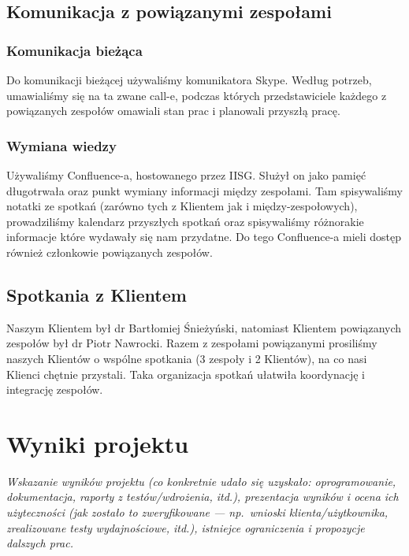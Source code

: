 \documentclass[polish,12pt]{aghthesis}
\begin{document}
\subsection{Komunikacja z powiązanymi zespołami}
\subsubsection{Komunikacja bieżąca}
Do komunikacji bieżącej używaliśmy komunikatora Skype. Według potrzeb, umawialiśmy się na ta zwane call-e, podczas których przedstawiciele każdego z powiązanych zespołów omawiali stan prac i planowali przyszłą pracę.
\subsubsection{Wymiana wiedzy}
Używaliśmy Confluence-a, hostowanego przez IISG. Służył on jako pamięć długotrwała oraz punkt wymiany informacji między zespołami. Tam spisywaliśmy notatki ze spotkań (zarówno tych z Klientem jak i między-zespołowych), prowadziliśmy kalendarz przyszłych spotkań oraz spisywaliśmy różnorakie informacje które wydawały się nam przydatne. Do tego Confluence-a mieli dostęp również członkowie powiązanych zespołów.

\subsection{Spotkania z Klientem}
Naszym Klientem był dr Bartłomiej Śnieżyński, natomiast Klientem powiązanych zespołów był dr Piotr Nawrocki. Razem z zespołami powiązanymi prosiliśmy naszych Klientów o wspólne spotkania (3 zespoły i 2 Klientów), na co nasi Klienci chętnie przystali. Taka organizacja spotkań ułatwiła koordynację i integrację zespołów.
  



\section{Wyniki projektu}

\label{sec:wyniki-projektu}

\emph{Wskazanie wyników projektu (co konkretnie udało się uzyskało:
  oprogramowanie, dokumentacja, raporty z testów/wdrożenia, itd.), prezentacja wyników
  i ocena ich użyteczności (jak zostało to zweryfikowane --- np.\ wnioski
  klienta/użytkownika, zrealizowane testy wydajnościowe, itd.),
  istniejce ograniczenia i propozycje dalszych prac.}
\end{document}
